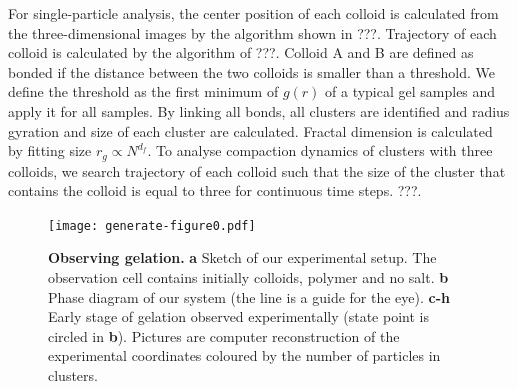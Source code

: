 For single-particle analysis, the center position of each colloid is calculated from the three-dimensional images by the algorithm shown in ???.
Trajectory of each colloid is calculated by the algorithm of ???.
Colloid A and B are defined as bonded if the distance between the two colloids is smaller than a threshold.
We define the threshold as the first minimum of $g(r)$ of a typical gel samples and apply it for all samples.
By linking all bonds, all clusters are identified and radius gyration and size of each cluster are calculated.
Fractal dimension is calculated by fitting size $r_g\propto N^{d_f}$.
To analyse compaction dynamics of clusters with three colloids, we search trajectory of each colloid such that the size of the cluster that contains the colloid is equal to three for continuous time steps.
???.


\clearpage
\begin{figure}
	\begin{center}
	\texttt{[image: generate-figure0.pdf]}
	\end{center}
	\caption{\textbf{Observing gelation.} \textbf{a} Sketch of our experimental setup. The observation cell contains initially colloids, polymer and no salt. \textbf{b} Phase diagram of our system (the line is a guide for the eye). \textbf{c-h} Early stage of gelation observed experimentally (state point is circled in \textbf{b}). Pictures are computer reconstruction of the experimental coordinates coloured by the number of particles in clusters.}
	\label{fig:methods}
\end{figure}

